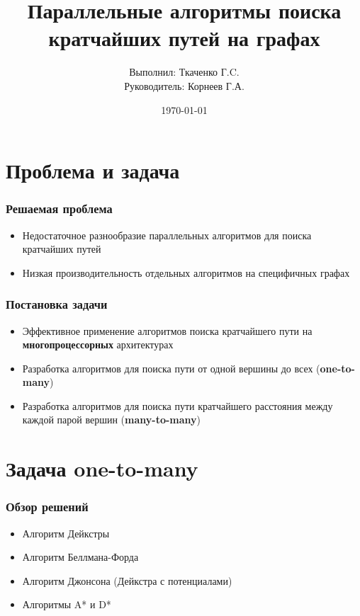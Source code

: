 \documentclass[10pt, compress]{beamer}
\title{Параллельные алгоритмы поиска кратчайших путей на графах}
\subtitle{}
\date{\today}
\author{Выполнил: Ткаченко Г.C. \\ Руководитель: Корнеев Г.А.}
\institute{Университет ИТМО}
\begin{document}
\maketitle

\section{Проблема и задача}
\begin{frame}[fragile]
  \frametitle{Решаемая проблема}

\begin{itemize}
	\item Недостаточное разнообразие параллельных алгоритмов для поиска кратчайших путей

    \item Низкая производительность отдельных алгоритмов на специфичных графах    
  \end{itemize}
\end{frame}

\begin{frame}[fragile]
  \frametitle{Постановка задачи}
\begin{itemize}
    \item Эффективное применение алгоритмов поиска кратчайшего пути на \textbf{многопроцессорных} архитектурах
    \item Разработка алгоритмов для поиска пути от одной вершины до всех (\textbf{one-to-many})
    \item Разработка алгоритмов для поиска пути кратчайшего расстояния между каждой парой вершин (\textbf{many-to-many})
  \end{itemize}
\end{frame}

\section{Задача one-to-many}

\begin{frame}[fragile]
  \frametitle{Обзор решений}
\begin{itemize}
    \item Алгоритм Дейкстры
    \item Алгоритм Беллмана-Форда
    \item Алгоритм Джонсона (Дейкстра с потенциалами)
    \item Алгоритмы A* и D*
  \end{itemize}
\end{frame}
\end{document}

